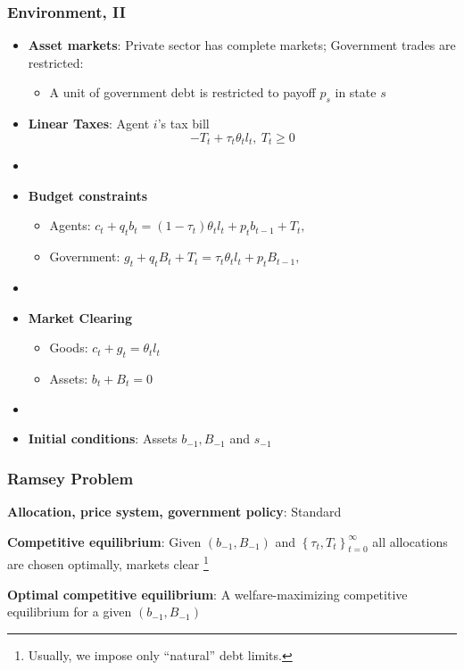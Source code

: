\documentclass{beamer}
\begin{document}
\begin{frame}
 \frametitle{Environment, II}
 \begin{itemize}
\item \textbf{Asset markets}: Private sector has complete markets; Government trades are restricted:
\begin{itemize}
	\item  A unit of government debt is restricted to payoff $p_s$ in state $s$
\end{itemize}
  \item \textbf{Linear Taxes}: Agent $i$'s tax bill
\[- T_t + \tau_t \theta_{t}l_{t},  \ T_t \geq 0 \]

\item[]
  \item \textbf{Budget constraints}
  \begin{itemize}
   \item Agents: $ c_{t}+q_tb_{t}=\left( 1-\tau _{t}\right) \theta _{t}l_{t}+p_{t}b_{t-1}+T_{t},$ %
  \item Government: $g_{t}+q_tB_{t}+T_t=\tau _{t}\theta_{t}l_{t}+p_{t}B_{t-1}, $%
  \end{itemize}

\item[]
  \item \textbf{Market Clearing}
  \begin{itemize}
   \item Goods: $c_{t}+g_t = \theta _{t} l_{t}$

   \item Assets: $b_{t}+B_{t}=0$
\end{itemize}
  \item[]

\item \textbf{Initial conditions}: Assets $b_{-1}, B_{-1}$ and  $s_{-1}$
\end{itemize}

\end{frame}


\begin{frame}
 \frametitle{Ramsey Problem}

\begin{definition}
\textbf{Allocation, price system, government policy}: Standard

\end{definition}

\begin{definition}
\textbf{Competitive equilibrium}: Given $\left(b_{-1},B_{-1}\right) $ and $\left\{ \tau _{t},T_{t}\right\} _{t=0}^{\infty }$
all allocations are chosen optimally, markets clear \footnote{Usually, we impose only  ``natural'' debt limits. }
\end{definition}

\begin{definition}
\textbf{Optimal competitive equilibrium}: A welfare-maximizing competitive
equilibrium for a given $\left( b_{-1},B_{-1}\right) $
\end{definition}

 \end{frame}
\end{document}
